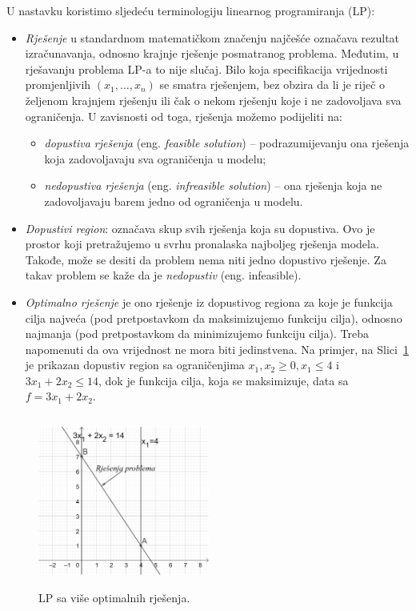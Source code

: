 \documentclass[a4paper, utf8, 11pt, colorlinks]{book}
\theoremstyle{definition}
\begin{document}
 U nastavku koristimo sljedeću terminologiju linearnog programiranja (LP):
\begin{itemize}
    \item \emph{Rješenje} u standardnom matematičkom značenju najčešće označava rezultat izračunavanja, odnosno krajnje rješenje posmatranog problema. Međutim, u rješavanju problema LP-a to  nije slučaj. Bilo koja specifikacija vrijednosti promjenljivih  $(x_1,\ldots, x_n)$ se smatra rješenjem, bez obzira da li je riječ o željenom krajnjem rješenju ili čak o nekom rješenju koje i ne zadovoljava sva ograničenja. U zavisnosti od toga, rješenja  možemo podijeliti na:
    \begin{itemize}
        \item \emph{dopustiva rješenja} (eng. \emph{feasible solution}) -- podrazumijevanju ona rješenja koja zadovoljavaju sva ograničenja u modelu;
        \item \emph{nedopustiva rješenja} (eng. \emph{infreasible solution}) -- ona rješenja koja ne zadovoljavaju barem jedno od ograničenja u modelu. 
    \end{itemize}
  \item \emph{Dopustivi region}: označava skup svih rješenja koja su dopustiva. Ovo je prostor koji pretražujemo u svrhu pronalaska najboljeg rješenja modela. Takođe, može se desiti da problem nema niti jedno dopustivo rješenje. Za takav problem se kaže da je \emph{nedopustiv} (eng. infeasible). 
  \item \emph{Optimalno rješenje} je ono rješenje iz dopustivog regiona za koje je funkcija cilja najveća (pod pretpostavkom da maksimizujemo funkciju cilja), odnosno najmanja (pod pretpostavkom da minimizujemo funkciju cilja). Treba napomenuti da ova vrijednost ne mora biti jedinstvena.  Na primjer, na Slici~\ref{fig:multi_solution} je prikazan dopustiv region sa ograničenjima $x_1, x_2 \geq 0, x_1 \leq 4 $ i $3 x_1 + 2 x_2 \leq 14$, dok je funkcija cilja, koja se maksimizuje, data sa $f = 3x_1 + 2 x_2$.  
 \end{itemize}
 
 \begin{figure}
     \centering
     \includegraphics[width=160pt, height=160pt]{fig3.eps}
     \caption{LP sa više optimalnih rješenja.}
     \label{fig:multi_solution}
 \end{figure}
 
\end{document}
